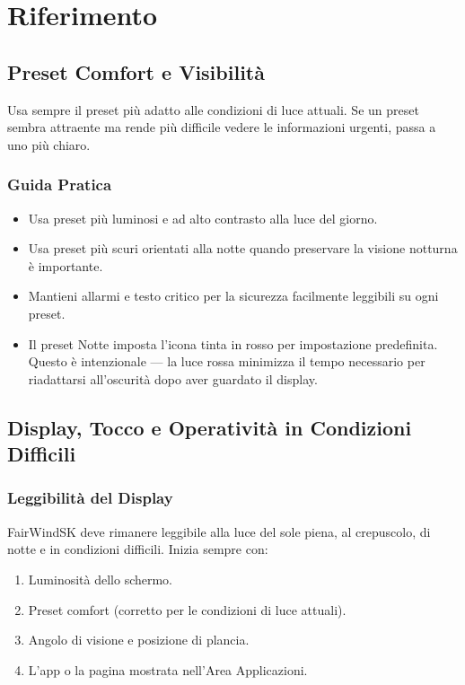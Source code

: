 \part{Riferimento}

\chapter{Preset Comfort e Visibilità}
\label{ch:preset-comfort}

Usa sempre il preset più adatto alle condizioni di luce attuali.
Se un preset sembra attraente ma rende più difficile vedere le informazioni urgenti,
passa a uno più chiaro.

\section{Guida Pratica}

\begin{itemize}
  \item Usa preset più luminosi e ad alto contrasto alla luce del giorno.
  \item Usa preset più scuri orientati alla notte quando preservare la visione notturna
        è importante.
  \item Mantieni allarmi e testo critico per la sicurezza facilmente leggibili
        su ogni preset.
  \item Il preset Notte imposta l'icona tinta in rosso per impostazione predefinita.
        Questo è intenzionale --- la luce rossa minimizza il tempo necessario per
        riadattarsi all'oscurità dopo aver guardato il display.
\end{itemize}

\chapter{Display, Tocco e Operatività in Condizioni Difficili}
\label{ch:condizioni-difficili}

\section{Leggibilità del Display}

FairWindSK deve rimanere leggibile alla luce del sole piena, al crepuscolo, di notte
e in condizioni difficili. Inizia sempre con:

\begin{enumerate}
  \item Luminosità dello schermo.
  \item Preset comfort (corretto per le condizioni di luce attuali).
  \item Angolo di visione e posizione di plancia.
  \item L'app o la pagina mostrata nell'Area Applicazioni.
\end{enumerate}

